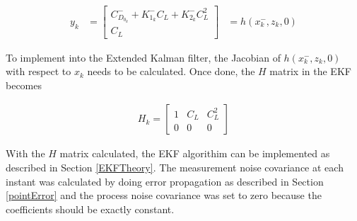 \begin{align}
y_k &= \begin{bmatrix} C^-_{D_{0_k}}+K^-_{1_k}C_L+K^-_{2_k}C^2_L \\ C_L \end{bmatrix} &=h(x^-_k,z_k,0)
\end{align}


To implement into the Extended Kalman filter, the Jacobian of $h(x^-_k,z_k,0)$ with respect to $x_k$ needs to be calculated. Once done, the $H$ matrix in the EKF becomes

\begin{align}
H_k = \begin{bmatrix}
1 & C_L & C^2_L\\0&0&0
\end{bmatrix}
\end{align}


With the $H$ matrix calculated, the EKF algorithim can be implemented as described in Section \ref{EKFTheory}. The measurement noise covariance at each instant was calculated by doing error propagation as described in Section \ref{pointError} and the process noise covariance was set to zero because the coefficients should be exactly constant.
